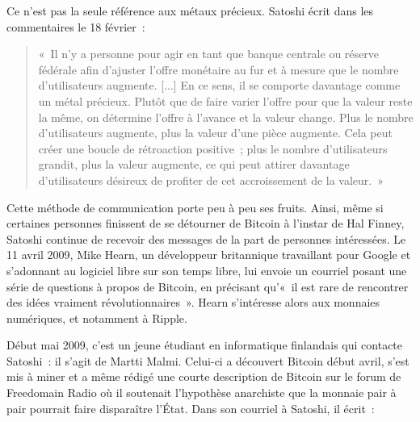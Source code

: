 Ce n'est pas la seule référence aux métaux précieux. Satoshi écrit dans les commentaires le 18 février~:

\begin{quote}
«~Il n'y a personne pour agir en tant que banque centrale ou réserve fédérale afin d'ajuster l'offre monétaire au fur et à mesure que le nombre d'utilisateurs augmente. [...] En ce sens, il se comporte davantage comme un métal précieux. Plutôt que de faire varier l'offre pour que la valeur reste la même, on détermine l'offre à l'avance et la valeur change. Plus le nombre d'utilisateurs augmente, plus la valeur d'une pièce augmente. Cela peut créer une boucle de rétroaction positive~; plus le nombre d'utilisateurs grandit, plus la valeur augmente, ce qui peut attirer davantage d'utilisateurs désireux de profiter de cet accroissement de la valeur.~»
\end{quote}


Cette méthode de communication porte peu à peu ses fruits. Ainsi, même si certaines personnes finissent de se détourner de Bitcoin à l'instar de Hal Finney, Satoshi continue de recevoir des messages de la part de personnes intéressées. Le 11 avril 2009, Mike Hearn, un développeur britannique travaillant pour Google et s'adonnant au logiciel libre sur son temps libre, lui envoie un courriel posant une série de questions à propos de Bitcoin, en précisant qu'«~il est rare de rencontrer des idées vraiment révolutionnaires~». Hearn s'intéresse alors aux monnaies numériques, et notamment à Ripple.

Début mai 2009, c'est un jeune étudiant en informatique finlandais qui contacte Satoshi~: il s'agit de Martti Malmi. Celui-ci a découvert Bitcoin début avril, s'est mis à miner et a même rédigé une courte description de Bitcoin sur le forum de Freedomain Radio où il soutenait l'hypothèse anarchiste que la monnaie pair à pair pourrait faire disparaître l'État. Dans son courriel à Satoshi, il écrit~:

